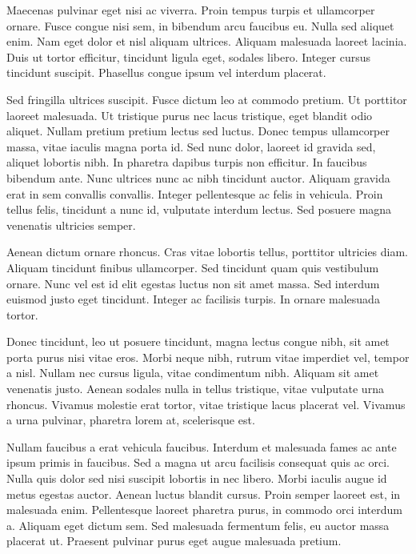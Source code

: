 \documentclass{article}
\begin{document}
	Maecenas pulvinar eget nisi ac viverra. Proin tempus turpis et ullamcorper ornare. Fusce congue nisi sem, in bibendum arcu faucibus eu. Nulla sed aliquet enim. Nam eget dolor et nisl aliquam ultrices. Aliquam malesuada laoreet lacinia. Duis ut tortor efficitur, tincidunt ligula eget, sodales libero. Integer cursus tincidunt suscipit. Phasellus congue ipsum vel interdum placerat.
	
	Sed fringilla ultrices suscipit. Fusce dictum leo at commodo pretium. Ut porttitor laoreet malesuada. Ut tristique purus nec lacus tristique, eget blandit odio aliquet. Nullam pretium pretium lectus sed luctus. Donec tempus ullamcorper massa, vitae iaculis magna porta id. Sed nunc dolor, laoreet id gravida sed, aliquet lobortis nibh. In pharetra dapibus turpis non efficitur. In faucibus bibendum ante. Nunc ultrices nunc ac nibh tincidunt auctor. Aliquam gravida erat in sem convallis convallis. Integer pellentesque ac felis in vehicula. Proin tellus felis, tincidunt a nunc id, vulputate interdum lectus. Sed posuere magna venenatis ultricies semper.
	
	Aenean dictum ornare rhoncus. Cras vitae lobortis tellus, porttitor ultricies diam. Aliquam tincidunt finibus ullamcorper. Sed tincidunt quam quis vestibulum ornare. Nunc vel est id elit egestas luctus non sit amet massa. Sed interdum euismod justo eget tincidunt. Integer ac facilisis turpis. In ornare malesuada tortor.
	
	Donec tincidunt, leo ut posuere tincidunt, magna lectus congue nibh, sit amet porta purus nisi vitae eros. Morbi neque nibh, rutrum vitae imperdiet vel, tempor a nisl. Nullam nec cursus ligula, vitae condimentum nibh. Aliquam sit amet venenatis justo. Aenean sodales nulla in tellus tristique, vitae vulputate urna rhoncus. Vivamus molestie erat tortor, vitae tristique lacus placerat vel. Vivamus a urna pulvinar, pharetra lorem at, scelerisque est.
	
	Nullam faucibus a erat vehicula faucibus. Interdum et malesuada fames ac ante ipsum primis in faucibus. Sed a magna ut arcu facilisis consequat quis ac orci. Nulla quis dolor sed nisi suscipit lobortis in nec libero. Morbi iaculis augue id metus egestas auctor. Aenean luctus blandit cursus. Proin semper laoreet est, in malesuada enim. Pellentesque laoreet pharetra purus, in commodo orci interdum a. Aliquam eget dictum sem. Sed malesuada fermentum felis, eu auctor massa placerat ut. Praesent pulvinar purus eget augue malesuada pretium.
\end{document}
